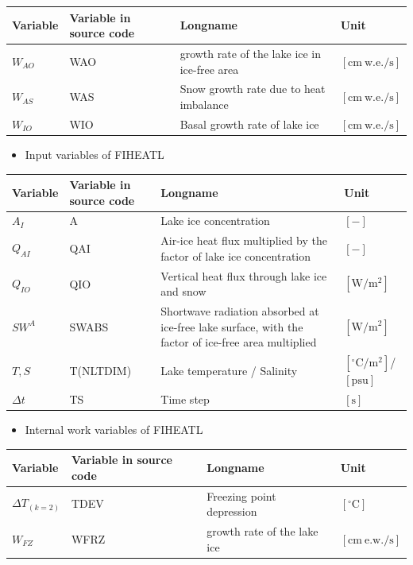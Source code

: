 \begin{longtable}[]{@{}llll@{}}
\toprule
Variable & Variable in source code & Longname & Unit \\
\midrule
\endhead
\(W_{AO}\) & WAO & growth rate of the lake ice in ice-free area & \(\mathrm{[cm\ w.e./s]}\) \\
\(W_{AS}\) & WAS & Snow growth rate due to heat imbalance & \(\mathrm{[cm\ w.e./s]}\) \\
\(W_{IO}\) & WIO & Basal growth rate of lake ice & \(\mathrm{[cm\ w.e./s]}\) \\
\bottomrule
\end{longtable}

\begin{itemize}
\tightlist
\item
  Input variables of FIHEATL
\end{itemize}

\begin{landscape}

\begin{longtable}[]{@{}llll@{}}
\toprule
Variable & Variable in source code & Longname & Unit \\
\midrule
\endhead
\(A_I\) & A & Lake ice concentration & \(\mathrm{[-]}\) \\
\(Q_{AI}\) & QAI & Air-ice heat flux multiplied by the factor of lake ice concentration & \(\mathrm{[-]}\) \\
\(Q_{IO}\) & QIO & Vertical heat flux through lake ice and snow & \(\mathrm{[W/m^2]}\) \\
\(SW^A\) & SWABS & Shortwave radiation absorbed at ice-free lake surface, with the factor of ice-free area multiplied & \(\mathrm{[W/m^2]}\) \\
\(T, S\) & T(NLTDIM) & Lake temperature / Salinity & \(\mathrm{[^\circ C/m^2]}\)/ \(\mathrm{[psu]}\) \\
\(\Delta t\) & TS & Time step & \(\mathrm{[s]}\) \\
\bottomrule
\end{longtable}

\end{landscape}

\begin{itemize}
\tightlist
\item
  Internal work variables of FIHEATL
\end{itemize}

\begin{longtable}[]{@{}llll@{}}
\toprule
Variable & Variable in source code & Longname & Unit \\
\midrule
\endhead
\(\Delta T_{(k=2)}\) & TDEV & Freezing point depression & \(\mathrm{[^\circ C]}\) \\
\(W_{FZ}\) & WFRZ & growth rate of the lake ice & \(\mathrm{[cm\ e.w./s]}\) \\
\bottomrule
\end{longtable}


